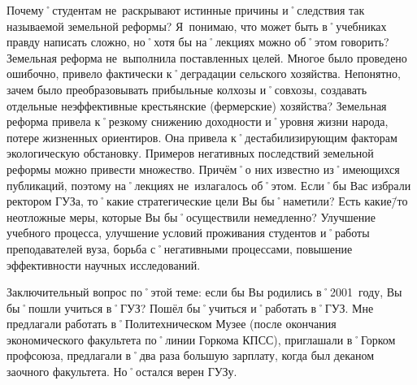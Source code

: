 \begin{drama}
Почему˚студентам не~раскрывают истинные причины и˚следствия так называемой земельной реформы? Я~понимаю, что может быть в˚учебниках правду написать сложно, но˚хотя бы на˚лекциях можно об˚этом говорить?
	\michaelspeaks Земельная реформа не~выполнила поставленных целей. Многое было проведено ошибочно, привело фактически к˚деградации сельского хозяйства. Непонятно, зачем было преобразовывать прибыльные колхозы и˚совхозы, создавать отдельные неэффективные крестьянские (фермерские) хозяйства?
	Земельная реформа привела к˚резкому снижению доходности и˚уровня жизни народа, потере жизненных ориентиров. Она привела к˚дестабилизирующим факторам экологическую обстановку. Примеров негативных последствий земельной реформы можно привести множество. Причём˚о них известно из˚имеющихся публикаций, поэтому на˚лекциях не~излагалось об˚этом.
	\maxspeaks Если˚бы Вас избрали ректором ГУЗа, то˚какие стратегические цели Вы бы˚наметили? Есть какие\=/то неотложные меры, которые Вы бы˚осуществили немедленно?
	\michaelspeaks Улучшение учебного процесса, улучшение условий проживания студентов и˚работы преподавателей вуза, борьба с˚негативными процессами, повышение эффективности научных исследований.
	
	\pagebreak
	
	\maxspeaks Заключительный вопрос по˚этой теме: если бы Вы родились в˚2001~году, Вы бы˚пошли учиться в˚ГУЗ?
	\michaelspeaks Пошёл бы˚учиться и˚работать в˚ГУЗ. Мне предлагали работать в˚Политехническом Музее (после окончания экономического факультета по˚линии Горкома КПСС), приглашали в˚Горком профсоюза, предлагали в˚два раза большую зарплату, когда был деканом заочного факультета. Но˚остался верен ГУЗу.


\end{drama}
